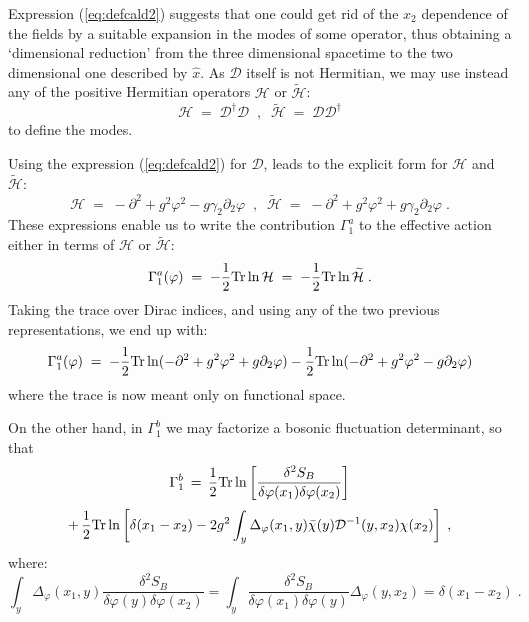 \documentclass[a4paper,12pt]{article}
\begin{document}
Expression (\ref{eq:defcald2}) suggests that one could get rid of the
$x_2$ dependence of the fields by a suitable expansion in the modes of
some operator, thus obtaining a `dimensional reduction' from the three
dimensional spacetime to the two dimensional one described by ${\hat
  x}$. As ${\mathcal D}$ itself is not Hermitian, we may use instead
any of the positive Hermitian operators ${\mathcal H}$ or
${\widetilde{\mathcal H}}$:
\begin{equation}
  \label{eq:defhht}
{\mathcal H} \;=\; {\mathcal D}^\dagger {\mathcal D} \;\;,\;\;
{\widetilde{\mathcal H}} \;=\; {\mathcal D} {\mathcal D}^\dagger 
\end{equation}
to define the modes.

Using the expression (\ref{eq:defcald2}) for ${\mathcal D}$, leads to
the explicit form for ${\mathcal H}$ and ${\widetilde{\mathcal H}}$:
\begin{equation}
  \label{eq:defh1}
{\mathcal H} \;=\; - \partial^2 + g^2 \varphi^2 - g \gamma_2 \partial_2 
\varphi \;\;,\;\; {\tilde{\mathcal H}} \;=\; - \partial^2 + g^2 \varphi^2 
+ g \gamma_2 \partial_2 \varphi \;.
\end{equation}
These expressions enable us to write the contribution $\Gamma_1^a$ to
the effective action either in terms of ${\mathcal H}$ or 
${\widetilde{\mathcal H}}$:
\begin{equation}
  \label{eq:gma1}
\Gamma_1^a(\varphi) \;=\; - \frac{1}{2}{\rm Tr}\ln{\mathcal H}\;=\; 
- \frac{1}{2}{\rm Tr}\ln {\widetilde{\mathcal H}} \;.
\end{equation}
Taking the trace over Dirac indices, and using any of the two
previous representations, we end up with:
\begin{equation}
  \label{eq:gma11}
\Gamma_1^a(\varphi) \;=\; -\frac{1}{2} {\rm Tr} \ln ( -\partial^2 
+ g^2 \varphi^2 + g \partial_2\varphi ) -\frac{1}{2} {\rm Tr} \ln ( 
-\partial^2 + g^2 \varphi^2 - g \partial_2\varphi )
\end{equation}
where the trace is now meant only on functional space.

On the other hand, in $\Gamma_1^b$ we may factorize a bosonic fluctuation 
determinant, so that
$$
\Gamma_1^b \,=\, \frac{1}{2} {\rm Tr} \ln \left[ \frac{\delta^2
    S_B}{\delta\varphi(x_1)\delta\varphi(x_2)}\right]
$$
\begin{equation}
  \label{eq:gmb1}
+\, \frac{1}{2} {\rm Tr} \ln \left[ \delta(x_1-x_2) 
- 2 g^2 \int_y \Delta_\varphi(x_1,y) {\bar \chi}(y)
{\mathcal D}^{-1}(y,x_2) \chi(x_2) \right] \;,
\end{equation}
where:
\begin{equation}\label{eq:delphi}
\int_y \Delta_\varphi(x_1,y) \frac{\delta^2 S_B}{\delta\varphi(y)\delta\varphi(x_2)}=\int_y \frac{\delta^2 S_B}{\delta\varphi(x_1)\delta\varphi(y)}
\Delta_\varphi(y,x_2)=\delta(x_1-x_2) \;.
\end{equation}
\end{document}
